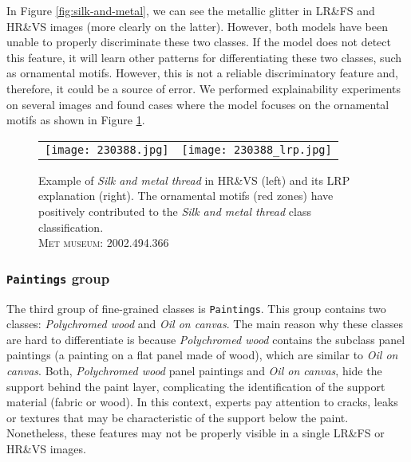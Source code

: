 \documentclass{article}
\begin{document}
In Figure \ref{fig:silk-and-metal}, we can see the metallic glitter in LR\&FS and HR\&VS images (more clearly on the latter). However, both models have been unable to properly discriminate these two classes. If the model does not detect this feature, it will learn other patterns for differentiating these two classes, such as ornamental motifs. However, this is not a reliable discriminatory feature and, therefore, it could be a source of error. We performed explainability experiments on several images and found cases where the model focuses on the ornamental motifs as shown in Figure \ref{fig:silk_and_metal_motifs}.


\begin{figure}[tb]
    \centering
    \begin{tabular}{cc}
        \texttt{[image: 230388.jpg]} &
        \texttt{[image: 230388\_lrp.jpg]}\\
    \end{tabular}   
    \caption{Example of \textit{Silk and metal thread} in HR\&VS (left) and its LRP explanation (right). The ornamental motifs (red zones) have positively contributed to the \textit{Silk and metal thread} class classification.\\
    \small{\textsc{Met museum: 2002.494.366}}}
    \label{fig:silk_and_metal_motifs}
\end{figure}


\subsubsection{\texttt{Paintings} group}
The third group of fine-grained classes is \texttt{Paintings}. This group contains two classes: \textit{Polychromed wood} and \textit{Oil on canvas}. The main reason why these classes are hard to differentiate is because \textit{Polychromed wood} contains the subclass panel paintings (\ie a painting on a flat panel made of wood), which are similar to \textit{Oil on canvas}. Both, \textit{Polychromed wood} panel paintings and \textit{Oil on canvas}, hide the support behind the paint layer, complicating the identification of the support material (fabric or wood). In this context, experts pay attention to cracks, leaks or textures that may be characteristic of the support below the paint. Nonetheless, these features may not be properly visible in a single LR\&FS or HR\&VS images.
\end{document}
